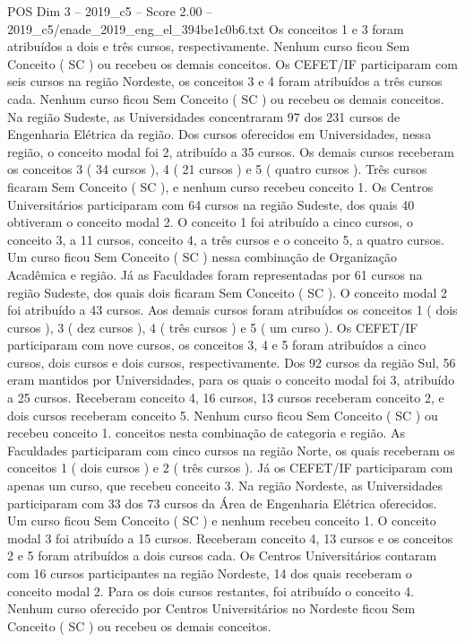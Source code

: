 \begin{textsample}{POS Dim 3 – 2019\_c5 – Score 2.00 – 2019\_c5/enade\_2019\_eng\_el\_394be1c0b6.txt}
Os conceitos 1 e 3 foram atribuídos a dois e três cursos, respectivamente.
Nenhum curso ficou Sem Conceito ( SC ) ou recebeu os demais conceitos.
Os CEFET/IF participaram com seis cursos na região Nordeste, os conceitos 3 e 4 foram atribuídos a três cursos cada.
Nenhum curso ficou Sem Conceito ( SC ) ou recebeu os demais conceitos.
Na região Sudeste, as Universidades concentraram 97 dos 231 cursos de Engenharia Elétrica da região.
Dos cursos oferecidos em Universidades, nessa região, o conceito modal foi 2, atribuído a 35 cursos.
Os demais cursos receberam os conceitos 3 ( 34 cursos ), 4 ( 21 cursos ) e 5 ( quatro cursos ).
Três cursos ficaram Sem Conceito ( SC ), e nenhum curso recebeu conceito 1.
Os Centros Universitários participaram com 64 cursos na região Sudeste, dos quais 40 obtiveram o conceito modal 2.
O conceito 1 foi atribuído a cinco cursos, o conceito 3, a 11 cursos, conceito 4, a três cursos e o conceito 5, a quatro cursos.
Um curso ficou Sem Conceito ( SC ) nessa combinação de Organização Acadêmica e região.
Já as Faculdades foram representadas por 61 cursos na região Sudeste, dos quais dois ficaram Sem Conceito ( SC ).
O conceito modal 2 foi atribuído a 43 cursos.
Aos demais cursos foram atribuídos os conceitos 1 ( dois cursos ), 3 ( dez cursos ), 4 ( três cursos ) e 5 ( um curso ).
Os CEFET/IF participaram com nove cursos, os conceitos 3, 4 e 5 foram atribuídos a cinco cursos, dois cursos e dois cursos, respectivamente.
Dos 92 cursos da região Sul, 56 eram mantidos por Universidades, para os quais o conceito modal foi 3, atribuído a 25 cursos.
Receberam conceito 4, 16 cursos, 13 cursos receberam conceito 2, e dois cursos receberam conceito 5.
Nenhum curso ficou Sem Conceito ( SC ) ou recebeu conceito 1. conceitos nesta combinação de categoria e região.
As Faculdades participaram com cinco cursos na região Norte, os quais receberam os conceitos 1 ( dois cursos ) e 2 ( três cursos ).
Já os CEFET/IF participaram com apenas um curso, que recebeu conceito 3.
Na região Nordeste, as Universidades participaram com 33 dos 73 cursos da Área de Engenharia Elétrica oferecidos.
Um curso ficou Sem Conceito ( SC ) e nenhum recebeu conceito 1.
O conceito modal 3 foi atribuído a 15 cursos.
Receberam conceito 4, 13 cursos e os conceitos 2 e 5 foram atribuídos a dois cursos cada.
Os Centros Universitários contaram com 16 cursos participantes na região Nordeste, 14 dos quais receberam o conceito modal 2.
Para os dois cursos restantes, foi atribuído o conceito 4.
Nenhum curso oferecido por Centros Universitários no Nordeste ficou Sem Conceito ( SC ) ou recebeu os demais conceitos.

\end{textsample}

